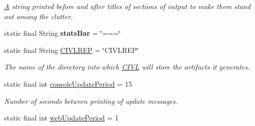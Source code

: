 \begin{DoxyCompactItemize}
\begin{DoxyCompactList}\small\item\em \hyperlink{structA}{A} string printed before and after titles of sections of output to make them stand out among the clutter. \end{DoxyCompactList}\item 
\hypertarget{classedu_1_1udel_1_1cis_1_1vsl_1_1civl_1_1config_1_1IF_1_1CIVLConstants_a0f9fc63043a17556ef41591b41be2150}{}static final String {\bfseries stats\+Bar} = \char`\"{}===\char`\"{}\label{classedu_1_1udel_1_1cis_1_1vsl_1_1civl_1_1config_1_1IF_1_1CIVLConstants_a0f9fc63043a17556ef41591b41be2150}

\item 
\hypertarget{classedu_1_1udel_1_1cis_1_1vsl_1_1civl_1_1config_1_1IF_1_1CIVLConstants_ab59fc721b68a8994f369388192a964fb}{}static final String \hyperlink{classedu_1_1udel_1_1cis_1_1vsl_1_1civl_1_1config_1_1IF_1_1CIVLConstants_ab59fc721b68a8994f369388192a964fb}{C\+I\+V\+L\+R\+E\+P} = \char`\"{}C\+I\+V\+L\+R\+E\+P\char`\"{}\label{classedu_1_1udel_1_1cis_1_1vsl_1_1civl_1_1config_1_1IF_1_1CIVLConstants_ab59fc721b68a8994f369388192a964fb}

\begin{DoxyCompactList}\small\item\em The name of the directory into which \hyperlink{classedu_1_1udel_1_1cis_1_1vsl_1_1civl_1_1CIVL}{C\+I\+V\+L} will store the artifacts it generates. \end{DoxyCompactList}\item 
\hypertarget{classedu_1_1udel_1_1cis_1_1vsl_1_1civl_1_1config_1_1IF_1_1CIVLConstants_ab291f95cfc02b9521886e3130e4bc36c}{}static final int \hyperlink{classedu_1_1udel_1_1cis_1_1vsl_1_1civl_1_1config_1_1IF_1_1CIVLConstants_ab291f95cfc02b9521886e3130e4bc36c}{console\+Update\+Period} = 15\label{classedu_1_1udel_1_1cis_1_1vsl_1_1civl_1_1config_1_1IF_1_1CIVLConstants_ab291f95cfc02b9521886e3130e4bc36c}

\begin{DoxyCompactList}\small\item\em Number of seconds between printing of update messages. \end{DoxyCompactList}\item 
\hypertarget{classedu_1_1udel_1_1cis_1_1vsl_1_1civl_1_1config_1_1IF_1_1CIVLConstants_a7e6c293a63e57a385aeb28bc24e8799b}{}static final int \hyperlink{classedu_1_1udel_1_1cis_1_1vsl_1_1civl_1_1config_1_1IF_1_1CIVLConstants_a7e6c293a63e57a385aeb28bc24e8799b}{web\+Update\+Period} = 1\label{classedu_1_1udel_1_1cis_1_1vsl_1_1civl_1_1config_1_1IF_1_1CIVLConstants_a7e6c293a63e57a385aeb28bc24e8799b}


\end{DoxyCompactItemize}
